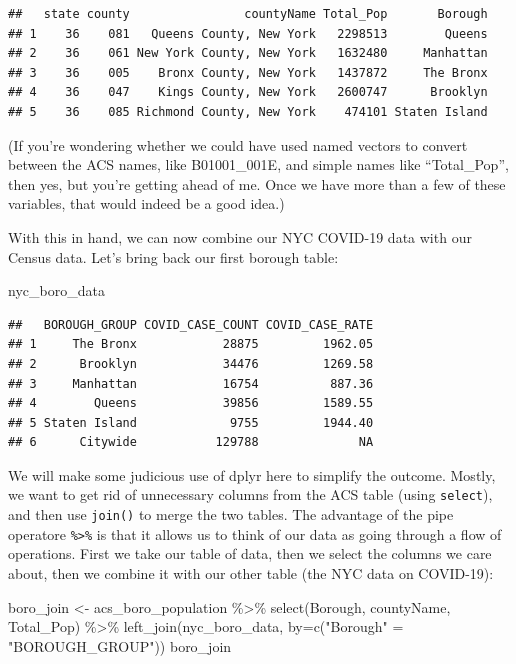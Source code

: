 \documentclass[
  openany]{book}
\newenvironment{Shaded}{\begin{snugshade}}{\end{snugshade}}
\newcommand{\AttributeTok}[1]{\textcolor[rgb]{0.77,0.63,0.00}{#1}}
\newcommand{\FunctionTok}[1]{\textcolor[rgb]{0.00,0.00,0.00}{#1}}
\newcommand{\NormalTok}[1]{#1}
\newcommand{\OtherTok}[1]{\textcolor[rgb]{0.56,0.35,0.01}{#1}}
\newcommand{\SpecialCharTok}[1]{\textcolor[rgb]{0.00,0.00,0.00}{#1}}
\newcommand{\StringTok}[1]{\textcolor[rgb]{0.31,0.60,0.02}{#1}}
\begin{document}
\begin{verbatim}
##   state county                countyName Total_Pop       Borough
## 1    36    081   Queens County, New York   2298513        Queens
## 2    36    061 New York County, New York   1632480     Manhattan
## 3    36    005    Bronx County, New York   1437872     The Bronx
## 4    36    047    Kings County, New York   2600747      Brooklyn
## 5    36    085 Richmond County, New York    474101 Staten Island
\end{verbatim}

(If you're wondering whether we could have used named vectors to convert between the ACS names, like B01001\_001E, and simple names like ``Total\_Pop'', then yes, but you're getting ahead of me. Once we have more than a few of these variables, that would indeed be a good idea.)

With this in hand, we can now combine our NYC COVID-19 data with our Census data. Let's bring back our first borough table:

\begin{Shaded}
\begin{Highlighting}[]
\NormalTok{nyc\_boro\_data}
\end{Highlighting}
\end{Shaded}

\begin{verbatim}
##   BOROUGH_GROUP COVID_CASE_COUNT COVID_CASE_RATE
## 1     The Bronx            28875         1962.05
## 2      Brooklyn            34476         1269.58
## 3     Manhattan            16754          887.36
## 4        Queens            39856         1589.55
## 5 Staten Island             9755         1944.40
## 6      Citywide           129788              NA
\end{verbatim}

We will make some judicious use of dplyr here to simplify the outcome. Mostly, we want to get rid of unnecessary columns from the ACS table (using \texttt{select}), and then use \texttt{join()} to merge the two tables. The advantage of the pipe operatore \texttt{\%\textgreater{}\%} is that it allows us to think of our data as going through a flow of operations. First we take our table of data, then we select the columns we care about, then we combine it with our other table (the NYC data on COVID-19):

\begin{Shaded}
\begin{Highlighting}[]
\NormalTok{boro\_join }\OtherTok{\textless{}{-}}\NormalTok{ acs\_boro\_population }\SpecialCharTok{\%\textgreater{}\%} \FunctionTok{select}\NormalTok{(Borough, countyName, Total\_Pop) }\SpecialCharTok{\%\textgreater{}\%} 
  \FunctionTok{left\_join}\NormalTok{(nyc\_boro\_data, }\AttributeTok{by=}\FunctionTok{c}\NormalTok{(}\StringTok{"Borough"} \OtherTok{=}  \StringTok{"BOROUGH\_GROUP"}\NormalTok{))}
\NormalTok{boro\_join}
\end{Highlighting}
\end{Shaded}
\end{document}
